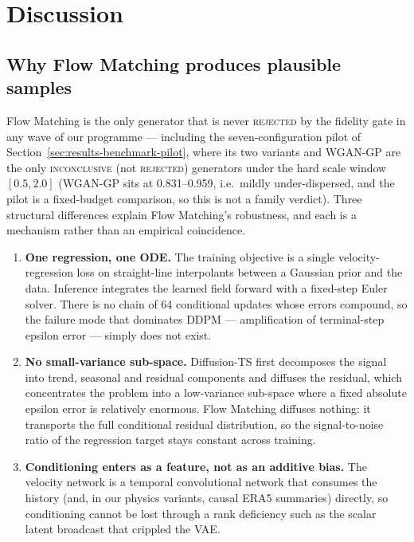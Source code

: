 \section{Discussion}
\label{sec:discussion}

\subsection{Why Flow Matching produces plausible samples}
\label{subsec:why-fm}

Flow Matching is the only generator that is never \textsc{rejected} by the
fidelity gate in any wave of our programme — including the seven-configuration pilot
of Section~\ref{sec:results-benchmark-pilot}, where its two variants and
WGAN-GP are the only \textsc{inconclusive} (not \textsc{rejected}) generators
under the hard scale window $[0.5, 2.0]$ (WGAN-GP sits at 0.831–0.959, i.e.\
mildly under-dispersed, and the pilot is a fixed-budget comparison, so this is
not a family verdict). Three structural
differences explain Flow Matching's robustness, and each is a mechanism
rather than an empirical coincidence.

\begin{enumerate}
    \item \textbf{One regression, one ODE.} The training objective is a single
    velocity-regression loss on straight-line interpolants between a Gaussian
    prior and the data. Inference integrates the learned field forward with a
    fixed-step Euler solver. There is no chain of 64 conditional updates whose
    errors compound, so the failure mode that dominates DDPM --- amplification of
    terminal-step epsilon error --- simply does not exist.
    \item \textbf{No small-variance sub-space.} Diffusion-TS first decomposes the
    signal into trend, seasonal and residual components and diffuses the
    residual, which concentrates the problem into a low-variance sub-space where
    a fixed absolute epsilon error is relatively enormous. Flow Matching diffuses
    nothing: it transports the full conditional residual distribution, so the
    signal-to-noise ratio of the regression target stays constant across
    training.
    \item \textbf{Conditioning enters as a feature, not as an additive bias.} The
    velocity network is a temporal convolutional network that consumes the
    history (and, in our physics variants, causal ERA5 summaries) directly, so
    conditioning cannot be lost through a rank deficiency such as the scalar
    latent broadcast that crippled the VAE.
\end{enumerate}

